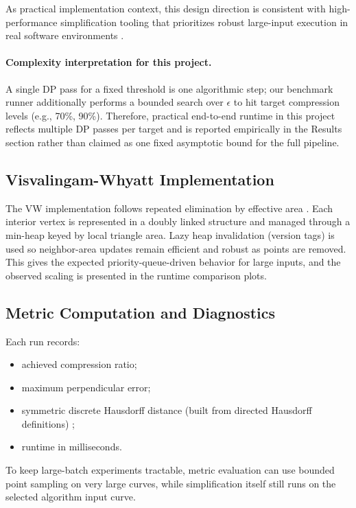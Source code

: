 \documentclass[12pt]{article}
\begin{document}
As practical implementation context, this design direction is consistent with high-performance simplification tooling that prioritizes robust large-input execution in real software environments \cite{mourner_simplify}.

\paragraph{Complexity interpretation for this project.}
A single DP pass for a fixed threshold is one algorithmic step; our benchmark runner additionally performs a bounded search over $\epsilon$ to hit target compression levels (e.g., 70\%, 90\%). Therefore, practical end-to-end runtime in this project reflects multiple DP passes per target and is reported empirically in the Results section rather than claimed as one fixed asymptotic bound for the full pipeline.

\subsection{Visvalingam-Whyatt Implementation}
The VW implementation follows repeated elimination by effective area \cite{vw1992}. Each interior vertex is represented in a doubly linked structure and managed through a min-heap keyed by local triangle area. Lazy heap invalidation (version tags) is used so neighbor-area updates remain efficient and robust as points are removed. This gives the expected priority-queue-driven behavior for large inputs, and the observed scaling is presented in the runtime comparison plots.

\subsection{Metric Computation and Diagnostics}
Each run records:
\begin{itemize}
    \item achieved compression ratio;
    \item maximum perpendicular error;
    \item symmetric discrete Hausdorff distance (built from directed Hausdorff definitions) \cite{scipy_hausdorff};
    \item runtime in milliseconds.
\end{itemize}
To keep large-batch experiments tractable, metric evaluation can use bounded point sampling on very large curves, while simplification itself still runs on the selected algorithm input curve.
\end{document}
